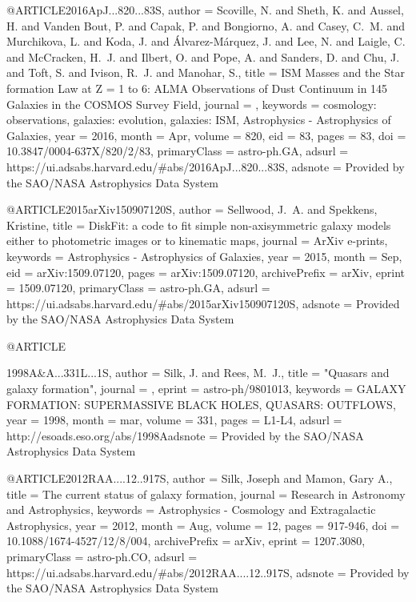 \documentclass[longauth]{aa}
\begin{document}
{{{@ARTICLE{2016ApJ...820...83S,
       author = {{Scoville}, N. and {Sheth}, K. and {Aussel}, H. and {Vanden Bout}, P. and {Capak}, P. and {Bongiorno}, A. and {Casey}, C.~M. and {Murchikova}, L. and {Koda}, J. and {{\'A}lvarez-M{\'a}rquez}, J. and {Lee}, N. and {Laigle}, C. and {McCracken}, H.~J. and {Ilbert}, O. and {Pope}, A. and {Sanders}, D. and {Chu}, J. and {Toft}, S. and {Ivison}, R.~J. and {Manohar}, S.},
        title = {ISM Masses and the Star formation Law at Z = 1 to 6: ALMA Observations of Dust Continuum in 145 Galaxies in the COSMOS Survey Field},
      journal = {\apj},
     keywords = {cosmology: observations, galaxies: evolution, galaxies: ISM, Astrophysics - Astrophysics of Galaxies},
         year = 2016,
        month = Apr,
       volume = {820},
          eid = {83},
        pages = {83},
          doi = {10.3847/0004-637X/820/2/83},
 primaryClass = {astro-ph.GA},
       adsurl = {https://ui.adsabs.harvard.edu/#abs/2016ApJ...820...83S},
      adsnote = {Provided by the SAO/NASA Astrophysics Data System}
}

@ARTICLE{2015arXiv150907120S,
       author = {{Sellwood}, J.~A. and {Spekkens}, Kristine},
        title = {DiskFit: a code to fit simple non-axisymmetric galaxy models either to photometric images or to kinematic maps},
      journal = {ArXiv e-prints},
     keywords = {Astrophysics - Astrophysics of Galaxies},
         year = 2015,
        month = Sep,
          eid = {arXiv:1509.07120},
        pages = {arXiv:1509.07120},
archivePrefix = {arXiv},
       eprint = {1509.07120},
 primaryClass = {astro-ph.GA},
       adsurl = {https://ui.adsabs.harvard.edu/#abs/2015arXiv150907120S},
      adsnote = {Provided by the SAO/NASA Astrophysics Data System}
}

@ARTICLE{1998A&A...331L...1S,
   author = {{Silk}, J. and {Rees}, M.~J.},
    title = "{Quasars and galaxy formation}",
  journal = {\aap},
   eprint = {astro-ph/9801013},
 keywords = {GALAXY FORMATION: SUPERMASSIVE BLACK HOLES, QUASARS: OUTFLOWS},
     year = 1998,
    month = mar,
   volume = 331,
    pages = {L1-L4},
   adsurl = {http://esoads.eso.org/abs/1998Aadsnote = {Provided by the SAO/NASA Astrophysics Data System}
}

@ARTICLE{2012RAA....12..917S,
       author = {{Silk}, Joseph and {Mamon}, Gary A.},
        title = {The current status of galaxy formation},
      journal = {Research in Astronomy and Astrophysics},
     keywords = {Astrophysics - Cosmology and Extragalactic Astrophysics},
         year = 2012,
        month = Aug,
       volume = {12},
        pages = {917-946},
          doi = {10.1088/1674-4527/12/8/004},
archivePrefix = {arXiv},
       eprint = {1207.3080},
 primaryClass = {astro-ph.CO},
       adsurl = {https://ui.adsabs.harvard.edu/#abs/2012RAA....12..917S},
      adsnote = {Provided by the SAO/NASA Astrophysics Data System}
}

}}}}
\end{document}
